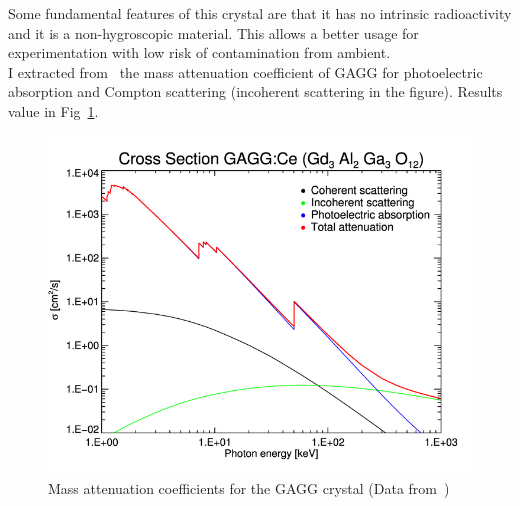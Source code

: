 \documentclass[10pt,a4paper, openany]{book}
\begin{document}
Some fundamental features of this crystal are that it has no intrinsic radioactivity and it is a non-hygroscopic material. This allows a better usage for experimentation with low risk of contamination from ambient.\\
I extracted from~\cite{gagg:2} the mass attenuation coefficient of GAGG for photoelectric absorption and Compton scattering (incoherent scattering in the figure). Results value in Fig~\ref{fig:cs_gagg}.

\begin{figure}[!h]
\begin{center}
\includegraphics[scale=0.24]{imm/cs_gagg.png}
\end{center}
\caption{Mass attenuation coefficients for the GAGG crystal (Data from~\cite{gagg:2})}
\label{fig:cs_gagg}
\end{figure}
\end{document}

